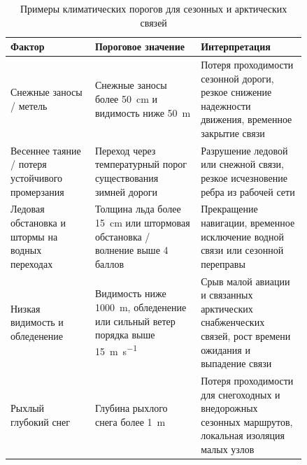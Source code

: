 \begin{table}[ht]
\centering
\caption{Примеры климатических порогов для сезонных и арктических связей}
\label{tab:arctic-climate-thresholds}
\begin{tabular}{p{0.24\linewidth} p{0.30\linewidth} p{0.30\linewidth}}
\hline
\textbf{Фактор} & \textbf{Пороговое значение} & \textbf{Интерпретация} \\
\hline
Снежные заносы / метель & Снежные заносы более \SI{50}{\centi\meter} и видимость ниже \SI{50}{\meter} & Потеря проходимости сезонной дороги, резкое снижение надежности движения, временное закрытие связи \\
\hline
Весеннее таяние / потеря устойчивого промерзания & Переход через температурный порог существования зимней дороги & Разрушение ледовой или снежной связи, резкое исчезновение ребра из рабочей сети \\
\hline
Ледовая обстановка и штормы на водных переходах & Толщина льда более \SI{15}{\centi\meter} или штормовая обстановка / волнение выше 4 баллов & Прекращение навигации, временное исключение водной связи или сезонной переправы \\
\hline
Низкая видимость и обледенение & Видимость ниже \SI{1000}{\meter}, обледенение или сильный ветер порядка выше \SI{15}{\meter\per\second} & Срыв малой авиации и связанных арктических снабженческих связей, рост времени ожидания и выпадение связи \\
\hline
Рыхлый глубокий снег & Глубина рыхлого снега более \SI{1}{\meter} & Потеря проходимости для снегоходных и внедорожных сезонных маршрутов, локальная изоляция малых узлов \\
\hline
\end{tabular}
\end{table}


